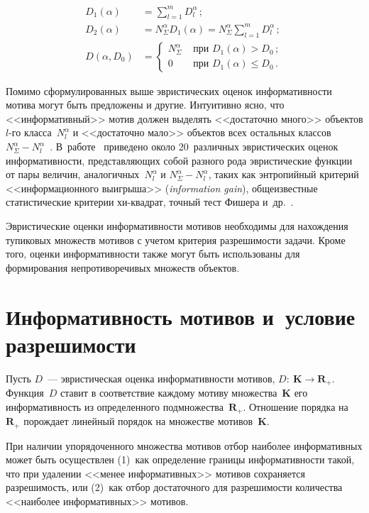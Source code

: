 \begin{multicols}{2}
\noindent
\begin{align*}
D_1(\alpha) &= \sum\limits_{l=1}^m D_l^\alpha\,;\\
D_2(\alpha) &= N_\Sigma^\alpha D_1(\alpha) = N_\Sigma^\alpha \sum\limits_{l=1}^m D_l^\alpha\,;\\
D(\alpha,D_0) &= \begin{cases}
N_\Sigma^\alpha & \mbox{\ при \ } D_1(\alpha)>D_0\,;\\
0 & \mbox{\ при \ } D_1(\alpha)\leq D_0\,.
\end{cases}
\end{align*}

Помимо сформулированных выше эвристических оценок информативности
мотива могут быть предложены и другие. Интуитивно ясно, что
<<информативный>> мотив должен выделять <<достаточно много>>
объектов $l$-го класса~$N_l^\alpha$ и <<достаточно мало>> объектов всех
остальных классов $N_\Sigma^\alpha-N_l^\alpha$~\cite{9-t}. В~работе~\cite{10-t}
приведено около 20~различных эвристических оценок информативности,
представляющих собой разного рода эвристические функции от пары
величин, аналогичных~$N_l^\alpha$ и $N_\Sigma^\alpha-N_l^\alpha$, таких как
энтропийный критерий <<информационного выигрыша>> (\textit{information
gain}), общеизвестные статистические критерии хи-квадрат, точный тест
Фишера и~др.~\cite{9-t, 10-t}.

Эвристические оценки информативности мотивов необходимы для
нахождения тупиковых множеств мотивов с учетом критерия разрешимости
задачи. Кроме того, оценки информативности также могут быть
использованы для формирования непротиворечивых множеств объектов.

\section{Информативность мотивов и~условие разрешимости} %

Пусть $D$~--- эвристическая оценка информативности мотивов, $D:\
\mathbf{K}\rightarrow \mathbf{R_+}$. Функция~$D$ ставит в соответствие
каждому мотиву множества~$\mathbf{K}$ его информативность из определенного
подмножества~$\mathbf{R_+}$. Отношение порядка на $\mathbf{R_+}$
порождает линейный порядок на множестве мотивов~$\mathbf{K}$.

При наличии упорядоченного множества мотивов отбор наиболее
информативных может быть осуществлен (1)~как определение границы
информативности такой, что при удалении <<менее информативных>>
мотивов сохраняется разрешимость, или (2)~как отбор достаточного для
разрешимости количества <<наиболее информативных>> мотивов.


\end{multicols}

